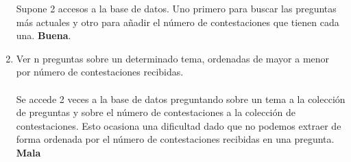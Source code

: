 \documentclass{article}
\begin{document}
\begin{enumerate}
      Supone 2 accesos a la base de datos. Uno primero para buscar las preguntas más actuales
      y otro para añadir el número de contestaciones que tienen cada una. \textbf{Buena}.
      \item Ver n preguntas sobre un determinado tema, ordenadas de mayor a menor
      por número de contestaciones recibidas.\\ \\
      Se accede 2 veces a la base de datos preguntando sobre un tema a la colección de
      preguntas y sobre el número de contestaciones a la colección de contestaciones. Esto 
      ocasiona una dificultad dado que no podemos extraer de forma ordenada por el número de
      contestaciones recibidas en una pregunta. \textbf{Mala}
    \end{enumerate}

    
\end{document}
